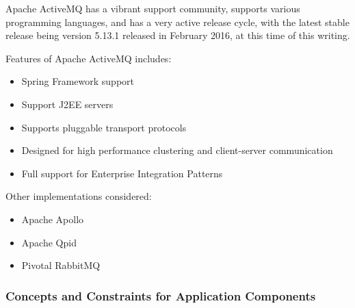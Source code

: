 Apache ActiveMQ has a vibrant support community, supports various programming
languages, and has a very active release cycle, with the latest stable release
being version 5.13.1 released in February 2016, at this time of this writing.

Features of Apache ActiveMQ includes:
\begin{itemize}
	\item Spring Framework support
	\item Support J2EE servers
	\item Supports pluggable transport protocols
	\item Designed for high performance clustering and client-server communication
	\item Full support for Enterprise Integration Patterns
\end{itemize}

Other implementations considered:
\begin{itemize}
	\item Apache Apollo
	\item Apache Qpid
	\item Pivotal RabbitMQ
\end{itemize}

\subsubsection{Concepts and Constraints for Application Components}
